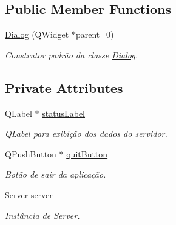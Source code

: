 \subsection*{Public Member Functions}
\begin{DoxyCompactItemize}
\item 
\hyperlink{classDialog_acfa2063f9f962d394c6a645b6e7e08d8}{Dialog} (Q\+Widget $\ast$parent=0)
\begin{DoxyCompactList}\small\item\em Construtor padrão da classe \hyperlink{classDialog}{Dialog}. \end{DoxyCompactList}\end{DoxyCompactItemize}
\subsection*{Private Attributes}
\begin{DoxyCompactItemize}
\item 
Q\+Label $\ast$ \hyperlink{classDialog_a0637bc55b1a71b4667477778a8c72f9a}{status\+Label}\hypertarget{classDialog_a0637bc55b1a71b4667477778a8c72f9a}{}\label{classDialog_a0637bc55b1a71b4667477778a8c72f9a}

\begin{DoxyCompactList}\small\item\em Q\+Label para exibição dos dados do servidor. \end{DoxyCompactList}\item 
Q\+Push\+Button $\ast$ \hyperlink{classDialog_adad2ac3f09934c21fb4c797a88496376}{quit\+Button}\hypertarget{classDialog_adad2ac3f09934c21fb4c797a88496376}{}\label{classDialog_adad2ac3f09934c21fb4c797a88496376}

\begin{DoxyCompactList}\small\item\em Botão de sair da aplicação. \end{DoxyCompactList}\item 
\hyperlink{classServer}{Server} \hyperlink{classDialog_aec51788da8fed7e13ad1a66b8e0c4379}{server}\hypertarget{classDialog_aec51788da8fed7e13ad1a66b8e0c4379}{}\label{classDialog_aec51788da8fed7e13ad1a66b8e0c4379}

\begin{DoxyCompactList}\small\item\em Instância de \hyperlink{classServer}{Server}. \end{DoxyCompactList}\end{DoxyCompactItemize}
